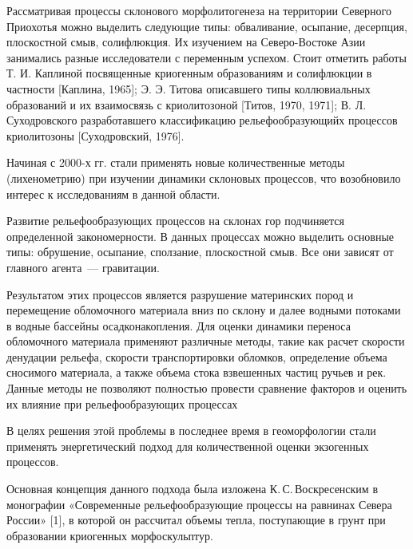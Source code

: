  

\makeProcTitle
{}

Рассматривая процессы склонового морфолитогенеза на территории Северного Приохотья
можно выделить следующие типы: обваливание, осыпание, десерпция, плоскостной смыв, солифлюкция.
Их изучением на Северо-Востоке Азии занимались разные исследователи с переменным успехом.
Стоит отметить работы Т. И. Каплиной посвященные криогенным образованиям
и солифлюкции в частности [Каплина, 1965]; Э. Э. Титова описавшего типы коллювиальных образований
и их взаимосвязь с криолитозоной [Титов, 1970, 1971]; В. Л. Суходровского разработавшего классификацию рельефообразующийх процессов криолитозоны [Суходровский, 1976].

Начиная с 2000-х гг. стали применять новые количественные методы (лихенометрию)
при изучении динамики склоновых процессов, что возобновило интерес к исследованиям в данной области.






Развитие рельефообразующих процессов на склонах гор подчиняется определенной
закономерности. В данных процессах можно выделить основные типы: обрушение,
осыпание, сползание, плоскостной смыв. Все они зависят от главного агента~---
гравитации.

Результатом этих процессов является разрушение материнских пород и перемещение
обломочного материала вниз по склону и далее водными потоками в водные бассейны
осадконакопления. Для оценки динамики переноса обломочного материала применяют
различные методы, такие как расчет скорости денудации рельефа, скорости
транспортировки обломков, определение объема сносимого материала, а также объема
стока взвешенных частиц ручьев и рек. Данные методы не позволяют полностью
провести сравнение факторов и оценить их влияние при рельефообразующих
процессах

В целях решения этой проблемы в последнее время в геоморфологии стали применять
энергетический подход для количественной оценки экзогенных процессов.

Основная концепция данного подхода была изложена К.\,С.\,Воскресенским в
монографии «Современные рельефообразующие процессы на равнинах Севера России»
[1], в которой он рассчитал объемы тепла, поступающие в грунт при образовании
криогенных морфоскульптур.

